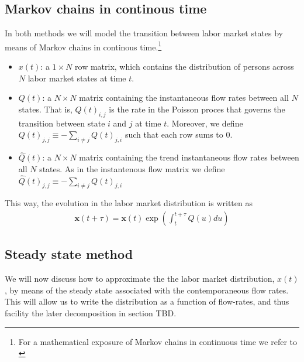 \subsection{Markov chains in continous time}

In both methods we will model the transition between labor market states by means of Markov chains in continous time.\footnote{For a mathematical exposure of Markov chains in continuous time we refer to \cite{Norris1997}}
\begin{itemize}
	\item $x(t)$: a $1 \times N$ row matrix, which contains the distribution of persons across $N$ labor market states at time $t$.
	\item $Q(t)$: a $N \times N$ matrix containing the instantaneous flow rates between all $N$ states. That is, $Q(t)_{i,j}$ is the rate in the Poisson proces that governs the transition between state $i$ and $j$ at time $t$. Moreover, we define $Q(t)_{j,j} \equiv -\sum_{i \neq j} Q(t)_{j,i} $ such that each row sums to 0. 
	\item $\hat{Q}(t)$:  a $N \times N$ matrix containing the trend instantaneous flow rates between all $N$ states. As in the instantenous flow matrix we define $\hat{Q}(t)_{j,j} \equiv -\sum_{i \neq j} Q(t)_{j,i} $
\end{itemize}

This way, the evolution in the labor market distribution is written as
\begin{align}
\mathbf{x}(t+\tau)=\mathbf{x}(t) \exp \left( \int_{t}^{t+\tau} Q(u) du \right)
\end{align}

\subsection{Steady state method}
\label{sec:method_st_st}

We will now discuss how to approximate the the labor market distribution, $x(t)$, by means of the steady state associated with the contemporaneous flow rates. This will allow us to write the distribution as a function of flow-rates, and thus facility the later decomposition in section TBD. 

